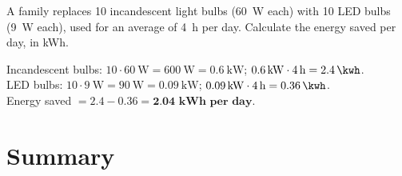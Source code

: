 \begin{exercise}
    A family replaces 10 incandescent light bulbs (\qty{60}{\watt} each) with 10 LED bulbs (\qty{9}{\watt} each), used for an average of \qty{4}{\hour} per day. Calculate the energy saved per day, in kWh.
    \begin{solu}
        Incandescent bulbs: \(10 \cdot \qty{60}{\watt} = \qty{600}{\watt} = \qty{0.6}{\kilo\watt}\); \(\qty{0.6}{\kilo\watt} \cdot \qty{4}{\hour} = \qty{2.4}{\kwh}\). \\
        LED bulbs: \(10 \cdot \qty{9}{\watt} = \qty{90}{\watt} = \qty{0.09}{\kilo\watt}\); \(\qty{0.09}{\kilo\watt} \cdot \qty{4}{\hour} = \qty{0.36}{\kwh}\). \\
        Energy saved \(= 2.4 - 0.36 = \textbf{2.04 kWh per day}\).
    \end{solu}
\end{exercise}


\section*{Summary}

